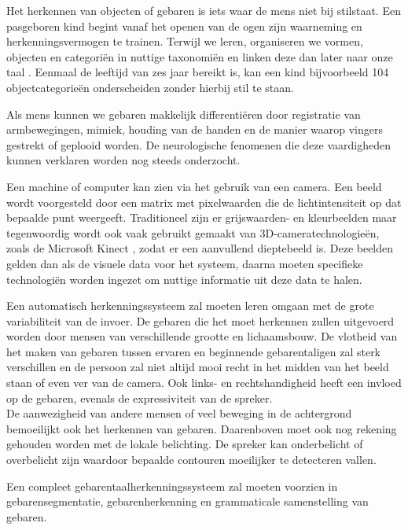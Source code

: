 \npar Het herkennen van objecten of gebaren is iets waar de mens niet bij stilstaat. Een pasgeboren kind begint vanaf het openen van de ogen zijn waarneming en herkenningsvermogen te trainen. Terwijl we leren, organiseren we vormen, objecten en categori\"en in nuttige taxonomi\"en en linken deze dan later naar onze taal \cite{oneshot-object-cat}. Eenmaal de leeftijd van zes jaar bereikt is, kan een kind bijvoorbeeld 104 objectcategorie\"en onderscheiden zonder hierbij stil te staan.

\npar Als mens kunnen we gebaren makkelijk differenti\"eren door registratie van armbewegingen, mimiek, houding van de handen en de manier waarop vingers gestrekt of geplooid worden. De neurologische fenomenen die deze vaardigheden kunnen verklaren worden nog steeds onderzocht. 

\npar Een machine of computer kan zien via het gebruik van een camera. Een beeld wordt voorgesteld door een matrix met pixelwaarden die de lichtintensiteit op dat bepaalde punt weergeeft. Traditioneel zijn er grijswaarden- en kleurbeelden maar tegenwoordig wordt ook vaak gebruikt gemaakt van 3D-cameratechnologie\"en, zoals de Microsoft Kinect \cite{kuhn2011kinect}, zodat er een aanvullend dieptebeeld is. Deze beelden gelden dan als de visuele data voor het systeem, daarna moeten specifieke technologi\"en worden ingezet om nuttige informatie uit deze data te halen.

\npar Een automatisch herkenningssysteem zal moeten leren omgaan met de grote variabiliteit van de invoer. De gebaren die het moet herkennen zullen uitgevoerd worden door mensen van verschillende grootte en lichaamsbouw. De vlotheid van het maken van gebaren tussen ervaren en beginnende gebarentaligen zal sterk verschillen en de persoon zal niet altijd mooi recht in het midden van het beeld staan of even ver van de camera. Ook links- en rechtshandigheid heeft een invloed op de gebaren, evenals de expressiviteit van de spreker.
\\ De aanwezigheid van andere mensen of veel beweging in de achtergrond bemoeilijkt ook het herkennen van gebaren. Daarenboven moet ook nog rekening gehouden worden met de lokale belichting. De spreker kan onderbelicht of overbelicht zijn waardoor bepaalde contouren moeilijker te detecteren vallen.

\npar Een compleet gebarentaalherkenningssysteem zal moeten voorzien in gebarensegmentatie, gebarenherkenning en grammaticale samenstelling van gebaren.

